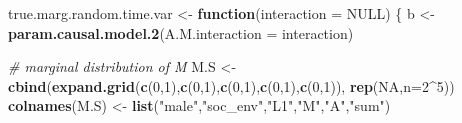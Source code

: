 \documentclass[
]{book}
\newenvironment{Shaded}{\begin{snugshade}}{\end{snugshade}}
\newcommand{\AttributeTok}[1]{\textcolor[rgb]{0.13,0.29,0.53}{#1}}
\newcommand{\CommentTok}[1]{\textcolor[rgb]{0.56,0.35,0.01}{\textit{#1}}}
\newcommand{\ConstantTok}[1]{\textcolor[rgb]{0.56,0.35,0.01}{#1}}
\newcommand{\ControlFlowTok}[1]{\textcolor[rgb]{0.13,0.29,0.53}{\textbf{#1}}}
\newcommand{\DecValTok}[1]{\textcolor[rgb]{0.00,0.00,0.81}{#1}}
\newcommand{\FunctionTok}[1]{\textcolor[rgb]{0.13,0.29,0.53}{\textbf{#1}}}
\newcommand{\NormalTok}[1]{#1}
\newcommand{\OtherTok}[1]{\textcolor[rgb]{0.56,0.35,0.01}{#1}}
\newcommand{\SpecialCharTok}[1]{\textcolor[rgb]{0.81,0.36,0.00}{\textbf{#1}}}
\newcommand{\StringTok}[1]{\textcolor[rgb]{0.31,0.60,0.02}{#1}}
\begin{document}
\begin{Shaded}
\begin{Highlighting}[]
\NormalTok{true.marg.random.time.var }\OtherTok{\textless{}{-}} \ControlFlowTok{function}\NormalTok{(}\AttributeTok{interaction =} \ConstantTok{NULL}\NormalTok{) \{}
\NormalTok{  b }\OtherTok{\textless{}{-}} \FunctionTok{param.causal.model.2}\NormalTok{(}\AttributeTok{A.M.interaction =}\NormalTok{ interaction)}
  
  \CommentTok{\# marginal distribution of M}
\NormalTok{  M.S }\OtherTok{\textless{}{-}} \FunctionTok{cbind}\NormalTok{(}\FunctionTok{expand.grid}\NormalTok{(}\FunctionTok{c}\NormalTok{(}\DecValTok{0}\NormalTok{,}\DecValTok{1}\NormalTok{),}\FunctionTok{c}\NormalTok{(}\DecValTok{0}\NormalTok{,}\DecValTok{1}\NormalTok{),}\FunctionTok{c}\NormalTok{(}\DecValTok{0}\NormalTok{,}\DecValTok{1}\NormalTok{),}\FunctionTok{c}\NormalTok{(}\DecValTok{0}\NormalTok{,}\DecValTok{1}\NormalTok{),}\FunctionTok{c}\NormalTok{(}\DecValTok{0}\NormalTok{,}\DecValTok{1}\NormalTok{)), }\FunctionTok{rep}\NormalTok{(}\ConstantTok{NA}\NormalTok{,}\AttributeTok{n=}\DecValTok{2}\SpecialCharTok{\^{}}\DecValTok{5}\NormalTok{))}
  \FunctionTok{colnames}\NormalTok{(M.S) }\OtherTok{\textless{}{-}} \FunctionTok{list}\NormalTok{(}\StringTok{"male"}\NormalTok{,}\StringTok{"soc\_env"}\NormalTok{,}\StringTok{"L1"}\NormalTok{,}\StringTok{"M"}\NormalTok{,}\StringTok{"A"}\NormalTok{,}\StringTok{"sum"}\NormalTok{)}
  

\end{Highlighting}
\end{Shaded}
\end{document}
